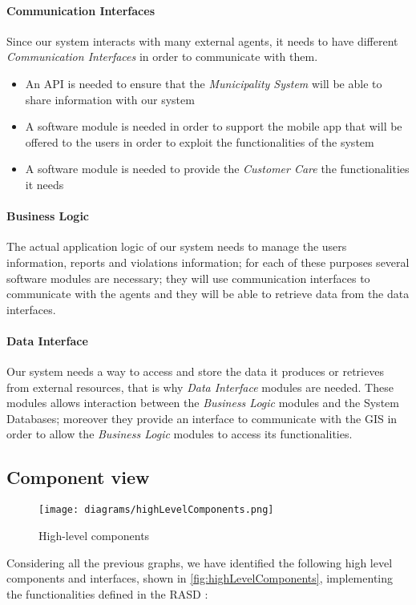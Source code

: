 		\paragraph{Communication Interfaces}
			Since our system interacts with many external agents, it needs to have different \emph{Communication Interfaces} in order to communicate with them. 
		\begin{itemize}
			\item An API is needed to ensure that the \emph{Municipality System} will be able to share information with our system
			\item A software module is needed in order to support the mobile app that will be offered to the users in order to exploit the functionalities of the system 
			\item A software module is needed to provide the \emph{Customer Care} the functionalities it needs
		\end{itemize}

		\paragraph{Business Logic}
			The actual application logic of our system needs to manage the users information, reports and violations information; for each of these purposes several software modules are necessary; they will use communication interfaces to communicate with the agents and they will be able to retrieve data from the data interfaces.
		\paragraph{Data Interface}
			Our system needs a way to access and store the data it produces or retrieves from external resources, that is why \emph{Data Interface} modules are needed. These modules allows interaction between the \emph{Business Logic} modules and the System Databases; moreover they provide an interface to communicate with the GIS in order to allow the \emph{Business Logic} modules to access its functionalities.

\clearpage

\subsection{Component view}
	\begin{figure}[ht!]
		\centering
		\texttt{[image: diagrams/highLevelComponents.png]}
		\caption{
			\label{fig:highLevelComponents} 
			High-level components
		}
	\end{figure} Considering all the previous graphs, we have identified the following high level components and interfaces, shown in \autoref{fig:highLevelComponents}, implementing the functionalities defined in the RASD \cite{RASD}:


